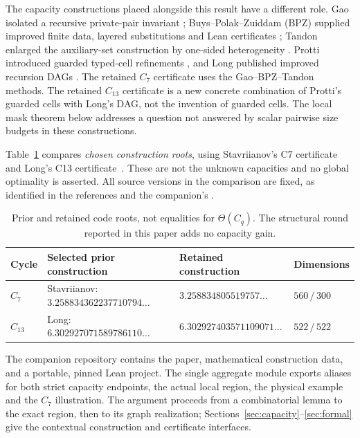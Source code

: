 \documentclass[11pt,a4paper]{article}
\theoremstyle{definition}
\theoremstyle{remark}
\newcommand{\code}[1]{\texttt{\detokenize{#1}}}
\begin{document}
The capacity constructions placed alongside this result have a different
role. Gao isolated a recursive private-pair invariant \cite{gao};
Buys--Polak--Zuiddam (BPZ) supplied improved finite data, layered
substitutions and Lean certificates \cite{bpz,bpzcode}; Tandon enlarged the
auxiliary-set construction by one-sided heterogeneity \cite{tandon}.
Protti introduced guarded typed-cell refinements \cite{protti}, and Long
published improved recursion DAGs \cite{long}. The retained $C_7$ certificate
uses the Gao--BPZ--Tandon methods. The retained $C_{13}$ certificate is a new
concrete combination of Protti's guarded cells with Long's DAG, not the
invention of guarded cells. The local mask theorem below addresses a question
not answered by scalar pairwise size budgets in these constructions.

Table~\ref{tab:roots} compares \emph{chosen construction roots}, using
Stavriianov's C7 certificate~\cite{stav} and Long's C13 certificate~\cite{long}. These are
not the unknown capacities and no global optimality is asserted. All source
versions in the comparison are fixed, as identified in the references and
the companion's \code{NOTICE.md}.
\begin{table}[ht]
\centering\small
\begin{tabular}{@{}llll@{}}
\toprule
Cycle & Selected prior construction & Retained construction & Dimensions\\
\midrule
$C_7$ & Stavriianov: $3.258834362237710794\ldots$
      & $3.258834805519757\ldots$ & $560\,/\,300$\\
$C_{13}$ & Long: $6.302927071589786110\ldots$
      & $6.302927403571109071\ldots$ & $522\,/\,522$\\
\bottomrule
\end{tabular}
\caption{Prior and retained code roots, not equalities for $\Theta(C_q)$.
The structural round reported in this paper adds no capacity gain.}
\label{tab:roots}
\end{table}

The companion repository contains the paper, mathematical construction data,
and a portable, pinned Lean project. The single aggregate module
\code{StructuralRelease} exports aliases for both strict capacity endpoints,
the actual local region, the physical example and the $C_7$ illustration.
The argument proceeds from a combinatorial lemma to the exact region, then
to its graph realization; Sections~\ref{sec:capacity}--\ref{sec:formal} give
the contextual construction and certificate interfaces.
\end{document}
